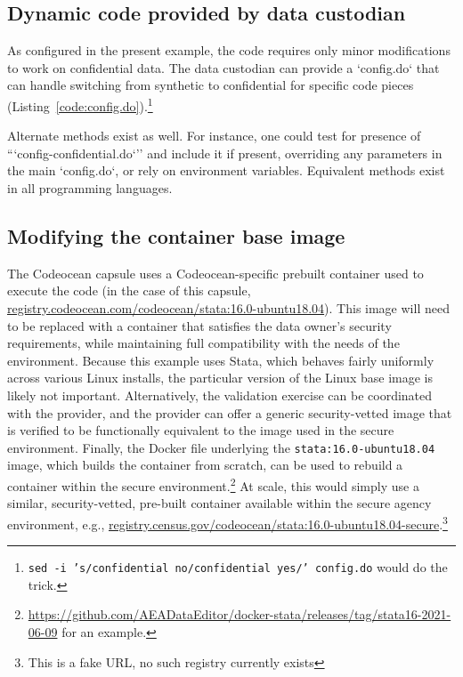 \documentclass[inline]{hdsr}
\begin{document}
\subsection{Dynamic code provided by data custodian}

As configured in the present example, the code requires only minor modifications to work on confidential data. The data custodian can provide a `config.do`  that can handle switching from synthetic to confidential for specific code pieces (Listing~\ref{code:config.do}).\footnote{\texttt{sed -i 's/confidential no/confidential yes/' config.do} would do the trick.}



Alternate methods exist as well. For instance, one could test for presence of ```config-confidential.do`'' and include it if present, overriding any parameters in the main `config.do`, or rely on environment variables. Equivalent methods exist in all programming languages.

\subsection{Modifying the container base image}

The Codeocean capsule uses a Codeocean-specific prebuilt container used to execute the code (in the case of this capsule, \url{registry.codeocean.com/codeocean/stata:16.0-ubuntu18.04}). This image will need to be replaced with a container that satisfies the data owner's security requirements, while maintaining full compatibility with the needs of the environment. Because this example uses Stata, which behaves fairly uniformly across various Linux installs, the particular version of the Linux base image is likely not important.   Alternatively, the validation exercise can be coordinated with the provider, and the provider can offer a generic security-vetted image that is verified to be functionally equivalent to the image used in the secure environment. Finally, the Docker file underlying the \texttt{stata:16.0-ubuntu18.04} image, which builds the container from scratch, can be used to rebuild a container within the secure environment.\footnote{\href{github.com/AEADataEditor/docker-stata/releases/tag/stata16-2021-06-09}{https://github.com/AEADataEditor/docker-stata/releases/tag/stata16-2021-06-09} for an example.} At scale, this would simply use a similar, security-vetted, pre-built container available within the secure agency environment, e.g., \url{registry.census.gov/codeocean/stata:16.0-ubuntu18.04-secure}.\footnote{This is a fake URL, no such registry currently exists}
\end{document}
